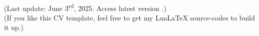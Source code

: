 \documentclass[localFont]{awesome-source-cv} %
\begin{document}
	\makecvheader

	
	
	

	\noindent \\		
	(Last update: June 3\textsuperscript{rd}, 2025. Access latest version .)\\
	(If you like this CV template, feel free to get  \hspace{0.35 mm} my LuaLaTeX source-codes to build it up.)
\end{document}
